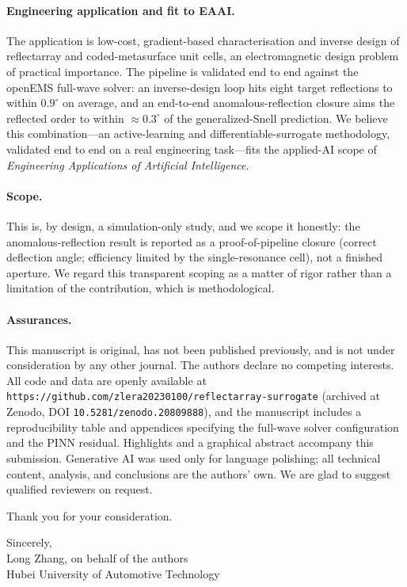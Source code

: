 \documentclass[11pt]{article}
\begin{document}
\paragraph{Engineering application and fit to EAAI.} The application is low-cost, gradient-based
characterisation and inverse design of reflectarray and coded-metasurface unit cells, an electromagnetic
design problem of practical importance. The pipeline is validated end to end against the openEMS full-wave
solver: an inverse-design loop hits eight target reflections to within $0.9^\circ$ on average, and an
end-to-end anomalous-reflection closure aims the reflected order to within $\approx 0.3^\circ$ of the
generalized-Snell prediction. We believe this combination---an active-learning and differentiable-surrogate
methodology, validated end to end on a real engineering task---fits the applied-AI scope of \emph{Engineering
Applications of Artificial Intelligence}.

\paragraph{Scope.} This is, by design, a simulation-only study, and we scope it honestly: the
anomalous-reflection result is reported as a proof-of-pipeline closure (correct deflection
angle; efficiency
limited by the single-resonance cell), not a finished aperture. We regard this transparent scoping as a
matter of rigor rather than a limitation of the contribution, which is methodological.

\paragraph{Assurances.} This manuscript is original, has not been published previously, and is not under
consideration by any other journal. The authors declare no competing interests. All code and data are
openly available at \texttt{https://github.com/zlera20230100/reflectarray-surrogate} (archived at Zenodo,
DOI \texttt{10.5281/zenodo.20809888}), and the manuscript includes a reproducibility table and appendices
specifying the full-wave solver configuration and the PINN residual. Highlights and a graphical abstract
accompany this submission. Generative AI was used only for language polishing; all technical content,
analysis, and conclusions are the authors' own. We are glad to suggest qualified reviewers on request.

Thank you for your consideration.

\vspace{10pt}
\noindent Sincerely,\\
Long Zhang, on behalf of the authors\\
Hubei University of Automotive Technology
\end{document}
